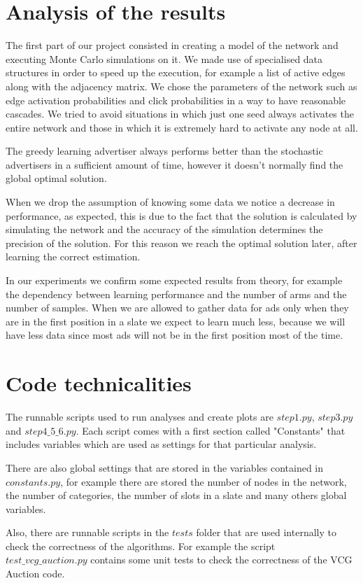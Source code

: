 \documentclass{article}
\begin{document}
\section{Analysis of the results}
The first part of our project consisted in creating a model of the network and executing Monte Carlo simulations on it. We made use of specialised data structures in order to speed up the execution, for example a list of active edges along with the adjacency matrix. We chose the parameters of the network such as edge activation probabilities and click probabilities in a way to have reasonable cascades. We tried to avoid situations in which just one seed always activates the entire network and those in which it is extremely hard to activate any node at all.

The greedy learning advertiser always performs better than the stochastic advertisers in a sufficient amount of time, however it doesn't normally find the global optimal solution.

When we drop the assumption of knowing some data we notice a decrease in performance, as expected, this is due to the fact that the solution is calculated by simulating the network and the accuracy of the simulation determines the precision of the solution. For this reason we reach the optimal solution later, after learning the correct estimation.

In our experiments we confirm some expected results from theory, for example the dependency between learning performance and the number of arms and the number of samples. When we are allowed to gather data for ads only when they are in the first position in a slate we expect to learn much less, because we will have less data since most ads will not be in the first position most of the time.

\newpage
\appendix

\section{Code technicalities}

The runnable scripts used to run analyses and create plots are $step1.py$, $step3.py$ and $step4\_5\_6.py$. Each script comes with a first section called "Constants" that includes variables which are used as settings for that particular analysis.

There are also global settings that are stored in the variables contained in $constants.py$, for example there are stored the number of nodes in the network, the number of categories, the number of slots in a slate and many others global variables.
\newline

Also, there are runnable scripts in the $tests$ folder that are used internally to check the correctness of the algorithms. For example the script $test\_vcg\_auction.py$ contains some unit tests to check the correctness of the VCG Auction code.
\end{document}
